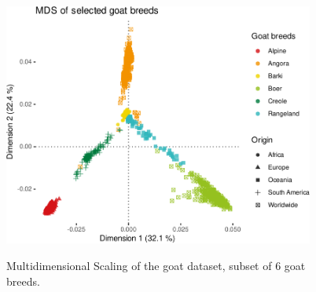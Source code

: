 \documentclass[a4paper,onecolumn,10pt]{article}
\begin{document}
\begin{figure}
    \centering
    \includegraphics[height=8cm]{../Figures/goat_mds_filtered.pdf}
    \label{fig:gwas_PCA}
    \caption{Multidimensional Scaling of the goat dataset, subset of 6 goat breeds.}
\end{figure}

\end{document}
